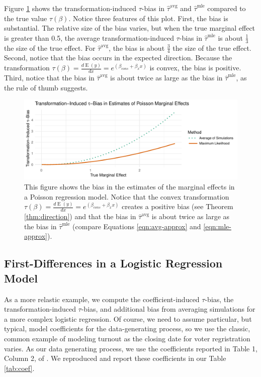 \documentclass[11pt]{article}
\DeclareMathOperator*{\E}{\text{E}}
\begin{document}
Figure \ref{fig:poisson-mcs} shows the transformation-induced $\tau$-bias in $\hat{\tau}^\text{avg}$ and $\hat{\tau}^\text{mle}$ compared to the true value $\tau(\beta)$.
Notice three features of this plot.
First, the bias is substantial.
The relative size of the bias varies, but when the true marginal effect is greater than 0.5, the average transformation-induced $\tau$-bias in $\hat{\tau}^\text{mle}$ is about $\frac{1}{3}$ the size of the true effect.
For $\hat{\tau}^\text{avg}$, the bias is about $\frac{3}{4}$ the size of the true effect.
Second, notice that the bias occurs in the expected direction.
Because the transformation $\tau(\beta) = \frac{d \E (y)}{dx} = e^{(\beta_{cons} + \beta_x x)}$ is convex, the bias is positive.
Third, notice that the bias in $\hat{\tau}^\text{avg}$ is about twice as large as the bias in $\hat{\tau}^\text{mle}$, as the rule of thumb suggests.

\begin{figure}[h!]
\begin{center}
\includegraphics[scale = 0.65]{figs/poisson-mcs.pdf}
\vspace{.1in}
\caption{This figure shows the bias in the estimates of the marginal effects in a Poisson regression model.
Notice that the convex transformation $\tau(\beta) = \frac{d \E (y)}{dx} = e^{(\beta_{cons} + \beta_x x)}$ creates a positive bias (see Theorem \ref{thm:direction}) and that the bias in $\hat{\tau}^\text{avg}$ is about twice as large as the bias in $\hat{\tau}^\text{mle}$ (compare Equations \ref{eqn:avg-approx} and \ref{eqn:mle-approx}).}\label{fig:poisson-mcs}
\end{center}
\end{figure}

\subsection*{First-Differences in a Logistic Regression Model}

As a more relastic example, we compute the coefficient-induced $\tau$-bias, the transformation-induced $\tau$-bias, and additional bias from averaging simulations for a more complex logistic regression. 
Of course, we need to assume particular, but typical, model coefficients for the data-generating process, so we use the classic, common example of modeling turnout \cite{WolfingerRosenstone1980, Nagler1994, HuangShields2000, BerryDeMerritEsarey2010} as the closing date for voter regristration varies.
As our data generating process, we use the coefficients reported in Table 1, Column 2, of \cite{BerryDeMerritEsarey2010}. 
We reproduced and report these coefficients in our Table \ref{tab:coef}. 
\end{document}
